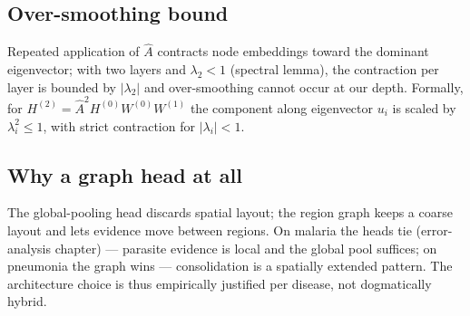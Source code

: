 \subsection{Over-smoothing bound}
Repeated application of $\hat A$ contracts node embeddings toward the
dominant eigenvector; with two layers and $\lambda_2 < 1$ (spectral
lemma), the contraction per layer is bounded by
$|\lambda_2|$ and over-smoothing cannot occur at our depth. Formally,
for $H^{(2)} = \hat A^2 H^{(0)} W^{(0)} W^{(1)}$ the component along
eigenvector $u_i$ is scaled by $\lambda_i^2 \le 1$, with strict
contraction for $|\lambda_i| < 1$.
\subsection{Why a graph head at all}
The global-pooling head discards spatial layout; the region graph keeps
a coarse layout and lets evidence move between regions. On malaria the
heads tie (error-analysis chapter) --- parasite evidence is local and the
global pool suffices; on pneumonia the graph wins --- consolidation is a
spatially extended pattern. The architecture choice is thus empirically
justified per disease, not dogmatically hybrid.
